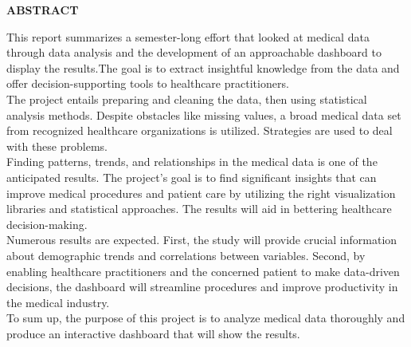 



\begin{center}
	{\Large{\bf{ABSTRACT}}}\\
\end{center}

\noindent
This report summarizes a semester-long effort that looked at medical data through data analysis and the development of an approachable dashboard to display the results.The goal is to extract insightful knowledge from the data and offer decision-supporting tools to healthcare practitioners.\\

\noindent
The project entails preparing and cleaning the data, then using statistical analysis methods. Despite obstacles like missing values, a broad medical data set from recognized healthcare organizations is utilized. Strategies are used to deal with these problems.\\

\noindent
Finding patterns, trends, and relationships in the medical data is one of the anticipated results. The project's goal is to find significant insights that can improve medical procedures and patient care by utilizing the right visualization libraries and statistical approaches. The results will aid in bettering healthcare decision-making.\\

\noindent
Numerous results are expected. First, the study will provide crucial information about demographic trends and correlations between variables. Second, by enabling healthcare practitioners and the concerned patient to make data-driven decisions, the dashboard will streamline procedures and improve productivity in the medical industry.\\

\noindent
To sum up, the purpose of this project is to analyze medical data thoroughly and produce an interactive dashboard that will show the results. \\